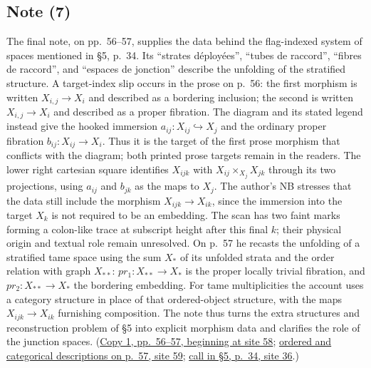 \subsection*{Note (7)}
The final note, on pp.~56--57, supplies the data behind the flag-indexed
system of spaces mentioned in \S5, p.~34. Its ``strates déployées'',
``tubes de raccord'', ``fibres de raccord'', and ``espaces de jonction''
describe the unfolding of the stratified structure. A target-index slip
occurs in the prose on p.~56: the first morphism is written
$X_{i,j}\longrightarrow X_i$ and described as a bordering inclusion;
the second is written $X_{i,j}\rightarrow X_i$ and described as a proper
fibration. The diagram and its stated legend
instead give the hooked immersion
$a_{ij}:X_{ij}\hookrightarrow X_j$ and the ordinary proper fibration
$b_{ij}:X_{ij}\longrightarrow X_i$. Thus it is the target of the first
prose morphism that conflicts with the diagram; both printed prose
targets remain in the readers. The lower right cartesian square identifies
$X_{ijk}$ with $X_{ij}\times_{X_j}X_{jk}$ through its two projections,
using $a_{ij}$ and $b_{jk}$ as the maps to $X_j$. The author's NB stresses
that the data still include the morphism
$X_{ijk}\longrightarrow X_{ik}$, since the immersion into the target
$X_k$ is not required to be an embedding. The scan has two faint marks
forming a colon-like trace at subscript height after this final $k$; their
physical origin and textual role remain unresolved. On p.~57
he recasts the unfolding of a stratified tame space using the sum $X_*$
of its unfolded strata and the order relation with graph $X_{**}$:
$pr_1:X_{**}\longrightarrow X_*$ is the proper locally trivial fibration,
and $pr_2:X_{**}\longrightarrow X_*$ the bordering embedding. For tame
multiplicities the account uses a category structure in place of that
ordered-object structure, with the maps
$X_{ijk}\longrightarrow X_{ik}$ furnishing composition. The note thus
turns the extra structures and reconstruction problem of \S5 into
explicit morphism data and clarifies the role of the junction spaces.
(\href{https://grothendieck.umontpellier.fr/web/viewer.html?file=../119.pdf\#page=59}{Copy 1, pp.~56--57, beginning at site 58};
\href{https://grothendieck.umontpellier.fr/web/viewer.html?file=../119.pdf\#page=60}{ordered and categorical descriptions on p.~57, site 59};
\href{https://grothendieck.umontpellier.fr/web/viewer.html?file=../119.pdf\#page=37}{call in \S5, p.~34, site 36}.)
